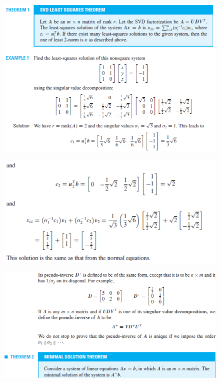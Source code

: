 \documentclass[12pt]{article}
\theoremstyle{theorem}
\begin{document}
\begin{figure}[h!]
	\centering
	\includegraphics[scale  = 0.7]{Figures/41}
\end{figure}

\begin{figure}[h!]
	\centering
	\includegraphics[scale  = 0.7]{Figures/42}
\end{figure}

\begin{figure}[h!]
	\centering
	\includegraphics[scale  = 0.7]{Figures/43}
\end{figure}
\end{document}
